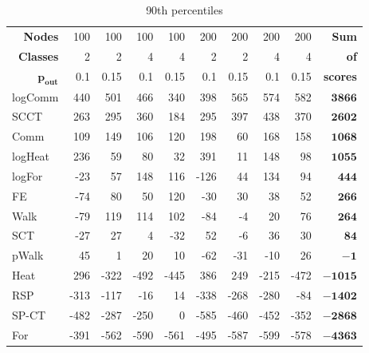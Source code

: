 \documentclass{article}
\begin{document}
\begin{table}[H]{\small
	\centering
	\begin{tabular}{lrrrrrrrrr}
		\toprule
		\multicolumn{1}{r}{\textbf{Nodes}}         & 100&    100& 100&  100& 200&  200& 200&  200&{\textbf{Sum}}\\
		\multicolumn{1}{r}{\textbf{Classes}}	   &   2&      2&   4&    4&   2&    2&   4&    4&{\textbf{  of}}\\
		\multicolumn{1}{r}{$\bm{p_{\mathbf{out}}}$}& 0.1&	0.15& 0.1& 0.15& 0.1& 0.15& 0.1& 0.15&{\textbf{scores}}\\
		\midrule
logComm & 440 & 501 & 466 & 340 & 398 & 565 & 574 & 582 & $\bm{3866}$\\
SCCT & 263 & 295 & 360 & 184 & 295 & 397 & 438 & 370 & $\bm{2602}$\\
Comm & 109 & 149 & 106 & 120 & 198 & 60 & 168 & 158 & $\bm{1068}$\\
logHeat & 236 & 59 & 80 & 32 & 391 & 11 & 148 & 98 & $\bm{1055}$\\
logFor & -23 & 57 & 148 & 116 & -126 & 44 & 134 & 94 & $\bm{444}$\\
FE & -74 & 80 & 50 & 120 & -30 & 30 & 38 & 52 & $\bm{266}$\\
Walk & -79 & 119 & 114 & 102 & -84 & -4 & 20 & 76 & $\bm{264}$\\
SCT & -27 & 27 & 4 & -32 & 52 & -6 & 36 & 30 & $\bm{84}$\\
pWalk & 45 & 1 & 20 & 10 & -62 & -31 & -10 & 26 &$\bm{-1}$\\
Heat & 296 & -322 & -492 & -445 & 386 & 249 & -215 & -472 & $\bm{-1015}$\\
RSP & -313 & -117 & -16 & 14 & -338 & -268 & -280 & -84 & $\bm{-1402}$\\
SP-CT & -482 & -287 & -250 & 0 & -585 & -460 & -452 & -352 & $\bm{-2868}$\\
For & -391 & -562 & -590 & -561 & -495 & -587 & -599 & -578 & $\bm{-4363}$\\
		\bottomrule
	\end{tabular}
	\caption{\label{t_CopComp} 90th percentiles}
}\end{table}

\newpage
\end{document}
